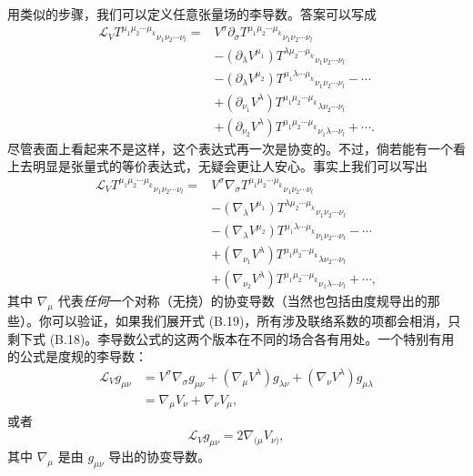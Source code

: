 用类似的步骤，我们可以定义任意张量场的李导数。答案可以写成
\begin{equation*}
\boxed{
\begin{aligned}
\mathcal{L}_V T^{\mu_1\mu_2\cdots\mu_k}{}_{\nu_1\nu_2\cdots\nu_l} ={}& V^\sigma \partial_\sigma T^{\mu_1\mu_2\cdots\mu_k}{}_{\nu_1\nu_2\cdots\nu_l} \\
&- (\partial_\lambda V^{\mu_1}) T^{\lambda\mu_2\cdots\mu_k}{}_{\nu_1\nu_2\cdots\nu_l} \\
&- (\partial_\lambda V^{\mu_2}) T^{\mu_1\lambda\cdots\mu_k}{}_{\nu_1\nu_2\cdots\nu_l} - \cdots \\
&+ (\partial_{\nu_1} V^\lambda) T^{\mu_1\mu_2\cdots\mu_k}{}_{\lambda\nu_2\cdots\nu_l} \\
&+ (\partial_{\nu_2} V^\lambda) T^{\mu_1\mu_2\cdots\mu_k}{}_{\nu_1\lambda\cdots\nu_l} + \cdots.
\end{aligned}
}
\tag{B.18}
\end{equation*}
尽管表面上看起来不是这样，这个表达式再一次是协变的。不过，倘若能有一个看上去明显是张量式的等价表达式，无疑会更让人安心。事实上我们可以写出
\begin{align*}
\mathcal{L}_V T^{\mu_1\mu_2\cdots\mu_k}{}_{\nu_1\nu_2\cdots\nu_l} ={}& V^\sigma \nabla_\sigma T^{\mu_1\mu_2\cdots\mu_k}{}_{\nu_1\nu_2\cdots\nu_l} \\
&- (\nabla_\lambda V^{\mu_1}) T^{\lambda\mu_2\cdots\mu_k}{}_{\nu_1\nu_2\cdots\nu_l} \\
&- (\nabla_\lambda V^{\mu_2}) T^{\mu_1\lambda\cdots\mu_k}{}_{\nu_1\nu_2\cdots\nu_l} - \cdots \\
&+ (\nabla_{\nu_1} V^\lambda) T^{\mu_1\mu_2\cdots\mu_k}{}_{\lambda\nu_2\cdots\nu_l} \\
&+ (\nabla_{\nu_2} V^\lambda) T^{\mu_1\mu_2\cdots\mu_k}{}_{\nu_1\lambda\cdots\nu_l} + \cdots, \tag{B.19}
\end{align*}
其中 $\nabla_\mu$ 代表\emph{任何}一个对称（无挠）的协变导数（当然也包括由度规导出的那些）。你可以验证，如果我们展开式 (B.19)，所有涉及联络系数的项都会相消，只剩下式 (B.18)。李导数公式的这两个版本在不同的场合各有用处。一个特别有用的公式是度规的李导数：
\begin{align*}
\mathcal{L}_V g_{\mu\nu} &= V^\sigma \nabla_\sigma g_{\mu\nu} + (\nabla_\mu V^\lambda) g_{\lambda\nu} + (\nabla_\nu V^\lambda) g_{\mu\lambda} \\
&= \nabla_\mu V_\nu + \nabla_\nu V_\mu, \tag{B.20}
\end{align*}
或者
\begin{equation*}
\boxed{\mathcal{L}_V g_{\mu\nu} = 2 \nabla_{(\mu} V_{\nu)},}
\tag{B.21}
\end{equation*}
其中 $\nabla_\mu$ 是由 $g_{\mu\nu}$ 导出的协变导数。

